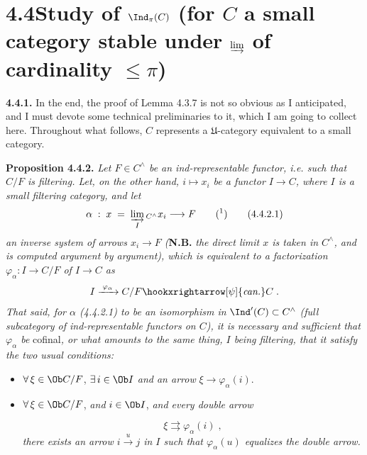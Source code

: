 
\section*{4.4\quad Study of $\Ind_\pi(C)$ (for $C$ a small category stable under $\varinjlim$ of cardinality $\leqslant \pi$)}

\textbf{4.4.1.} In the end, the proof of Lemma 4.3.7 is not so obvious as I anticipated, and I must devote some technical preliminaries to it, which I am going to collect here. Throughout what follows, $C$ represents a $\mathfrak{U}$-category equivalent to a small category.


\textbf{Proposition 4.4.2.} \textit{Let $F \in C^{\wedge}$ be an ind-representable functor, i.e. such that $C/F$ is filtering. Let, on the other hand, $i \longmapsto x_i$ be a functor $I \longrightarrow C$, where $I$ is a small filtering category, and let}
\[
\alpha \;:\; x \;=\; \varinjlim_{I}{}_{C^{\wedge}} x_i \longrightarrow F \qquad \text{(\footnotemark)} \tag*{(4.4.2.1)}
\]
\textit{an inverse system of arrows $x_i \longrightarrow F$ (}\textbf{N.B.} \textit{the direct limit $x$ is taken in $C^{\wedge}$, and is computed argument by argument), which is equivalent to a factorization $\varphi_\alpha : I \longrightarrow C/F$ of $I \longrightarrow C$ as}
\[
I \xrightarrow{\;\varphi_\alpha\;} C/F \hookxrightarrow[\psi]{\textit{can.}} C \;.
\]
\textit{That said, for $\alpha$ (4.4.2.1) to be an isomorphism in} $\Ind'(C) \subset C^{\wedge}$ \textit{(full subcategory of ind-representable functors on $C$), it is necessary and sufficient that $\varphi_\alpha$ be} cofinal\textit{, or what amounts to the same thing, $I$ being filtering, that it satisfy the two usual conditions:}
\begin{itemize}[leftmargin=2.5em]
\item[F\,1)] $\forall\, \xi \in \Ob C/F$, $\exists\, i \in \Ob I$ \textit{and an arrow} $\xi \longrightarrow \varphi_\alpha(i)$.
\item[F\,2)] $\forall\, \xi \in \Ob C/F$, \textit{and} $i \in \Ob I$, \textit{and every double arrow}

\[
\xi \rightrightarrows \varphi_\alpha(i) \;,
\]
\textit{there exists an arrow $i \xrightarrow{\;u\;} j$ in $I$ such that $\varphi_\alpha(u)$ equalizes the double arrow.}
\end{itemize}
